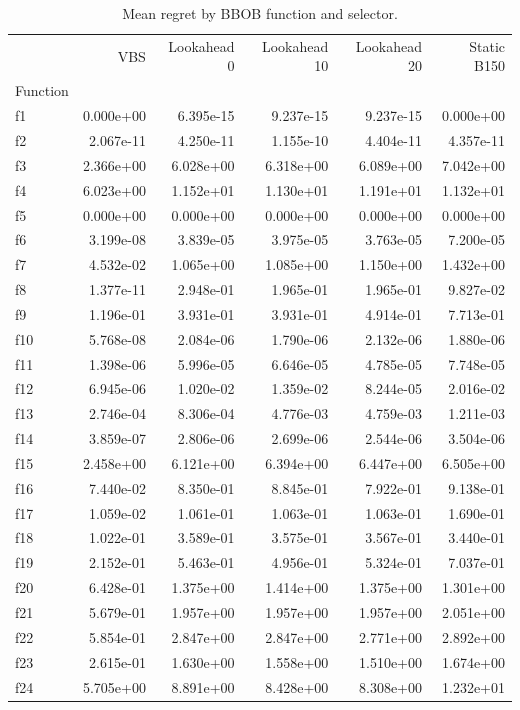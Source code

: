 \begin{table}
\caption{Mean regret by BBOB function and selector.}
\label{tab:function-wise-mean-regret}
\begin{tabular}{lrrrrr}
\toprule
 & VBS & Lookahead 0 & Lookahead 10 & Lookahead 20 & Static B150 \\
Function &  &  &  &  &  \\
\midrule
f1 & 0.000e+00 & 6.395e-15 & 9.237e-15 & 9.237e-15 & 0.000e+00 \\
f2 & 2.067e-11 & 4.250e-11 & 1.155e-10 & 4.404e-11 & 4.357e-11 \\
f3 & 2.366e+00 & 6.028e+00 & 6.318e+00 & 6.089e+00 & 7.042e+00 \\
f4 & 6.023e+00 & 1.152e+01 & 1.130e+01 & 1.191e+01 & 1.132e+01 \\
f5 & 0.000e+00 & 0.000e+00 & 0.000e+00 & 0.000e+00 & 0.000e+00 \\
f6 & 3.199e-08 & 3.839e-05 & 3.975e-05 & 3.763e-05 & 7.200e-05 \\
f7 & 4.532e-02 & 1.065e+00 & 1.085e+00 & 1.150e+00 & 1.432e+00 \\
f8 & 1.377e-11 & 2.948e-01 & 1.965e-01 & 1.965e-01 & 9.827e-02 \\
f9 & 1.196e-01 & 3.931e-01 & 3.931e-01 & 4.914e-01 & 7.713e-01 \\
f10 & 5.768e-08 & 2.084e-06 & 1.790e-06 & 2.132e-06 & 1.880e-06 \\
f11 & 1.398e-06 & 5.996e-05 & 6.646e-05 & 4.785e-05 & 7.748e-05 \\
f12 & 6.945e-06 & 1.020e-02 & 1.359e-02 & 8.244e-05 & 2.016e-02 \\
f13 & 2.746e-04 & 8.306e-04 & 4.776e-03 & 4.759e-03 & 1.211e-03 \\
f14 & 3.859e-07 & 2.806e-06 & 2.699e-06 & 2.544e-06 & 3.504e-06 \\
f15 & 2.458e+00 & 6.121e+00 & 6.394e+00 & 6.447e+00 & 6.505e+00 \\
f16 & 7.440e-02 & 8.350e-01 & 8.845e-01 & 7.922e-01 & 9.138e-01 \\
f17 & 1.059e-02 & 1.061e-01 & 1.063e-01 & 1.063e-01 & 1.690e-01 \\
f18 & 1.022e-01 & 3.589e-01 & 3.575e-01 & 3.567e-01 & 3.440e-01 \\
f19 & 2.152e-01 & 5.463e-01 & 4.956e-01 & 5.324e-01 & 7.037e-01 \\
f20 & 6.428e-01 & 1.375e+00 & 1.414e+00 & 1.375e+00 & 1.301e+00 \\
f21 & 5.679e-01 & 1.957e+00 & 1.957e+00 & 1.957e+00 & 2.051e+00 \\
f22 & 5.854e-01 & 2.847e+00 & 2.847e+00 & 2.771e+00 & 2.892e+00 \\
f23 & 2.615e-01 & 1.630e+00 & 1.558e+00 & 1.510e+00 & 1.674e+00 \\
f24 & 5.705e+00 & 8.891e+00 & 8.428e+00 & 8.308e+00 & 1.232e+01 \\
\bottomrule
\end{tabular}
\end{table}

